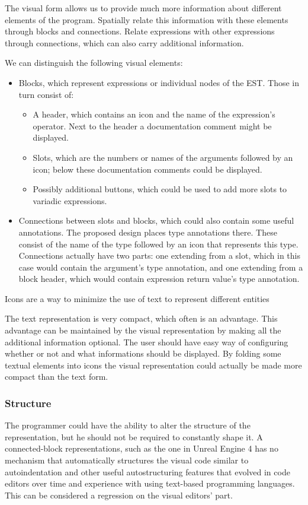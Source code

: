 The visual form allows us to provide much more information about different elements of the program.
Spatially relate this information with these elements through blocks and connections.
Relate expressions with other expressions through connections, which can also carry additional information.

We can distinguish the following visual elements:
\begin{itemize}
	\item Blocks, which represent expressions or individual nodes of the EST. Those in turn consist of:
	\begin{itemize}
		\item A header, which contains an icon and the name of the expression's operator. Next to the header a documentation comment might be displayed.
		\item Slots, which are the numbers or names of the arguments followed by an icon; below these documentation comments could be displayed.
		\item Possibly additional buttons, which could be used to add more slots to variadic expressions.
	\end{itemize}
	\item Connections between slots and blocks, which could also contain some useful annotations. The proposed design places type annotations there. These consist of the name of the type followed by an icon that represents this type. Connections actually have two parts: one extending from a slot, which in this case would contain the argument's type annotation, and one extending from a block header, which would contain expression return value's type annotation.
\end{itemize}

Icons are a way to minimize the use of text to represent different entities

The text representation is very compact, which often is an advantage. This advantage can be maintained by the visual representation by making all the additional information optional. The user should have easy way of configuring whether or not and what informations should be displayed. By folding some textual elements into icons the visual representation could actually be made more compact than the text form.

\subsubsection{Structure}
The programmer could have the ability to alter the structure of the representation, but he should not be required to constantly shape it. A connected-block representations, such as the one in Unreal Engine 4 has no mechanism that automatically structures the visual code similar to autoindentation and other useful autostructuring features that evolved in code editors over time and experience with using text-based programming languages. This can be considered a regression on the visual editors' part. 


